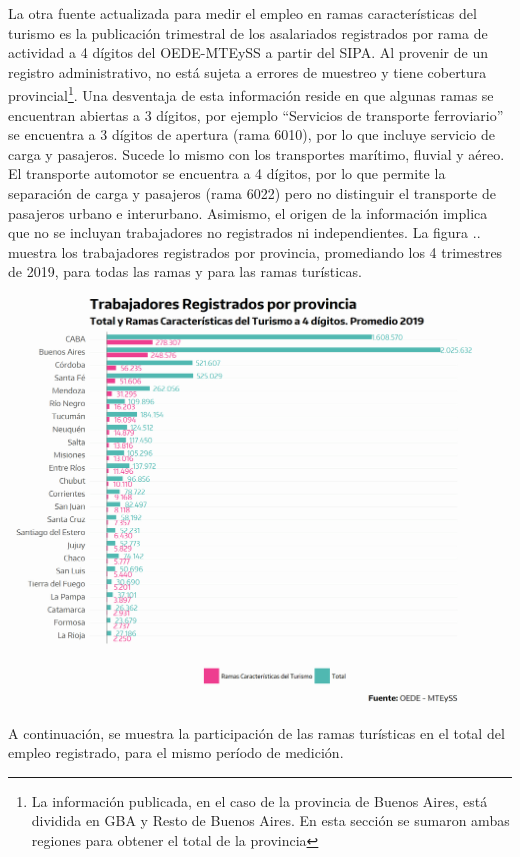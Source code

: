 \documentclass[
  openany]{book}
\begin{document}
La otra fuente actualizada para medir el empleo en ramas características del turismo es la publicación trimestral de los asalariados registrados por rama de actividad a 4 dígitos del OEDE-MTEySS a partir del SIPA. Al provenir de un registro administrativo, no está sujeta a errores de muestreo y tiene cobertura provincial\footnote{La información publicada, en el caso de la provincia de Buenos Aires, está dividida en GBA y Resto de Buenos Aires. En esta sección se sumaron ambas regiones para obtener el total de la provincia}. Una desventaja de esta información reside en que algunas ramas se encuentran abiertas a 3 dígitos, por ejemplo ``Servicios de transporte ferroviario'' se encuentra a 3 dígitos de apertura (rama 6010), por lo que incluye servicio de carga y pasajeros. Sucede lo mismo con los transportes marítimo, fluvial y aéreo. El transporte automotor se encuentra a 4 dígitos, por lo que permite la separación de carga y pasajeros (rama 6022) pero no distinguir el transporte de pasajeros urbano e interurbano.
Asimismo, el origen de la información implica que no se incluyan trabajadores no registrados ni independientes. La figura .. muestra los trabajadores registrados por provincia, promediando los 4 trimestres de 2019, para todas las ramas y para las ramas turísticas.

\begin{center}\includegraphics[width=1\linewidth]{imagenes/empleo.prov} \end{center}

A continuación, se muestra la participación de las ramas turísticas en el total del empleo registrado, para el mismo período de medición.
\end{document}
